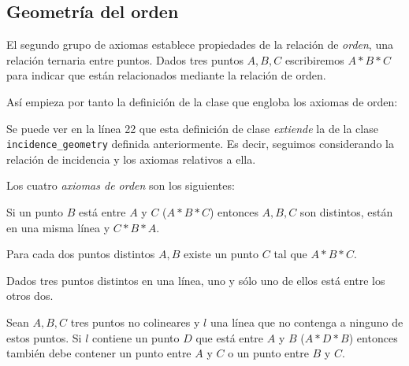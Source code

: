 \subsection{Geometría del orden}

El segundo grupo de axiomas establece propiedades de la relación de
\textit{orden}, una relación ternaria entre puntos. Dados tres puntos $A, B, C$
escribiremos $A * B * C$ para indicar que están relacionados mediante la
relación de orden.

Así empieza por tanto la definición de la clase que engloba los axiomas de
orden:


Se puede ver en la línea 22 que esta definición de clase \textit{extiende} la de
la clase \lstinline{incidence_geometry} definida anteriormente. Es decir,
seguimos considerando la relación de incidencia y los axiomas relativos a ella.

Los cuatro \textit{axiomas de orden} son los siguientes:

\begin{ax}\label{ax:B1}
	Si un punto $B$ está entre $A$ y $C$ ($A * B * C$) entonces $A, B, C$ son
	distintos, están en una misma línea y $C * B * A$.
\end{ax}


\begin{ax}\label{ax:B2}
	Para cada dos puntos distintos $A,B$ existe un punto $C$ tal que $A * B * C$.
\end{ax}


\begin{ax}\label{ax:3}
	Dados tres puntos distintos en una línea, uno y sólo uno de ellos está entre
	los otros dos.
\end{ax}


\begin{ax}[Pasch]\label{ax:4}
	Sean $A, B, C$ tres puntos no colineares y $l$ una línea que no contenga a
	ninguno de estos puntos. Si $l$ contiene un punto $D$ que está entre $A$ y $B$
	($A * D * B$) entonces también debe contener un punto entre $A$ y $C$ o un
	punto entre $B$ y $C$.
\end{ax}


